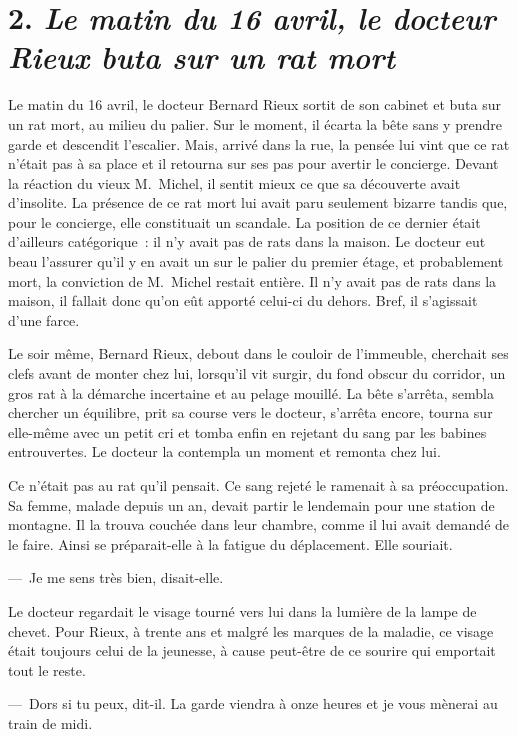 \documentclass[french,twoside]{book} %
\begin{document}
\section[{2. Le matin du 16 avril, le docteur Rieux buta sur un rat mort}]{2. \emph{Le matin du 16 avril, le docteur Rieux buta sur un rat mort}}
\noindent Le matin du 16 avril, le docteur Bernard Rieux sortit de son cabinet et buta sur un rat mort, au milieu du palier. Sur le moment, il écarta la bête sans y prendre garde et descendit l’escalier. Mais, arrivé dans la rue, la pensée lui vint que ce rat n’était pas à sa place et il retourna sur ses pas pour avertir le concierge. Devant la réaction du vieux M. Michel, il sentit mieux ce que sa découverte avait d’insolite. La présence de ce rat mort lui avait paru seulement bizarre tandis que, pour le concierge, elle constituait un scandale. La position de ce dernier était d’ailleurs catégorique : il n’y avait pas de rats dans la maison. Le docteur eut beau l’assurer qu’il y en avait un sur le palier du premier étage, et probablement mort, la conviction de M. Michel restait entière. Il n’y avait pas de rats dans la maison, il fallait donc qu’on eût apporté celui-ci du dehors. Bref, il s’agissait d’une farce.\par
Le soir même, Bernard Rieux, debout dans le couloir de l’immeuble, cherchait ses clefs avant de monter chez lui, lorsqu’il vit surgir, du fond obscur du corridor, un gros rat à la démarche incertaine et au pelage mouillé. La bête s’arrêta, sembla chercher un équilibre, prit sa course vers le docteur, s’arrêta encore, tourna sur elle-même avec un petit cri et tomba enfin en rejetant du sang par les babines entrouvertes. Le docteur la contempla un moment et remonta chez lui.\par
Ce n’était pas au rat qu’il pensait. Ce sang rejeté le ramenait à sa préoccupation. Sa femme, malade depuis un an, devait partir le lendemain pour une station de montagne. Il la trouva couchée dans leur chambre, comme il lui avait demandé de le faire. Ainsi se préparait-elle à la fatigue du déplacement. Elle souriait.\par
— Je me sens très bien, disait-elle.\par
Le docteur regardait le visage tourné vers lui dans la lumière de la lampe de chevet. Pour Rieux, à trente ans et malgré les marques de la maladie, ce visage était toujours celui de la jeunesse, à cause peut-être de ce sourire qui emportait tout le reste.\par
— Dors si tu peux, dit-il. La garde viendra à onze heures et je vous mènerai au train de midi.\par
\end{document}
